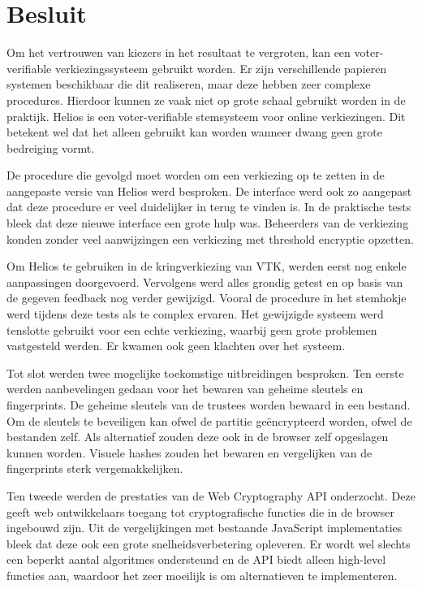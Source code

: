 % 
%

\chapter{Besluit}
\label{chap:besluit}

Om het vertrouwen van kiezers in het resultaat te vergroten, kan een voter-verifiable verkiezingssysteem gebruikt worden. Er zijn verschillende papieren systemen beschikbaar die dit realiseren, maar deze hebben zeer complexe procedures. Hierdoor kunnen ze vaak niet op grote schaal gebruikt worden in de praktijk. Helios is een voter-verifiable stemsysteem voor online verkiezingen. Dit betekent wel dat het alleen gebruikt kan worden wanneer dwang geen grote bedreiging vormt.

\npar De procedure die gevolgd moet worden om een verkiezing op te zetten in de aangepaste versie van Helios werd besproken. De interface werd ook zo aangepast dat deze procedure er veel duidelijker in terug te vinden is. In de praktische tests bleek dat deze nieuwe interface een grote hulp was. Beheerders van de verkiezing konden zonder veel aanwijzingen een verkiezing met threshold encryptie opzetten.

\npar Om Helios te gebruiken in de kringverkiezing van VTK, werden eerst nog enkele aanpassingen doorgevoerd. Vervolgens werd alles grondig getest en op basis van de gegeven feedback nog verder gewijzigd. Vooral de procedure in het stemhokje werd tijdens deze tests als te complex ervaren. Het gewijzigde systeem werd tenslotte gebruikt voor een echte verkiezing, waarbij geen grote problemen vastgesteld werden. Er kwamen ook geen klachten over het systeem.

\npar Tot slot werden twee mogelijke toekomstige uitbreidingen besproken. Ten eerste werden aanbevelingen gedaan voor het bewaren van geheime sleutels en fingerprints. De geheime sleutels van de trustees worden bewaard in een bestand. Om de sleutels te beveiligen kan ofwel de partitie ge\"encrypteerd worden, ofwel de bestanden zelf. Als alternatief zouden deze ook in de browser zelf opgeslagen kunnen worden. Visuele hashes zouden het bewaren en vergelijken van de fingerprints sterk vergemakkelijken.

\npar Ten tweede werden de prestaties van de Web Cryptography API onderzocht. Deze geeft web ontwikkelaars toegang tot cryptografische functies die in de browser ingebouwd zijn. Uit de vergelijkingen met bestaande JavaScript implementaties bleek dat deze ook een grote snelheidsverbetering opleveren. Er wordt wel slechts een beperkt aantal algoritmes ondersteund en de API biedt alleen high-level functies aan, waardoor het zeer moeilijk is om alternatieven te implementeren.
